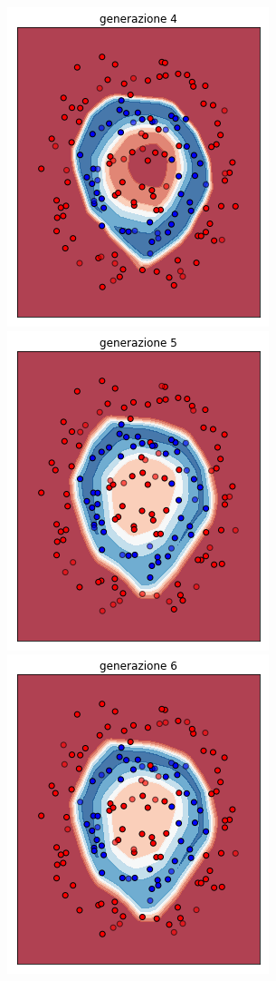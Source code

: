 \documentclass[12pt,a4paper]{report}
\begin{document}
\begin{figure}[H]
 \includegraphics[scale = 0.3]{images/circle+-rnd-acc./4}
 \includegraphics[scale = 0.3]{images/circle+-rnd-acc./5}
 \\
 \includegraphics[scale = 0.3]{images/circle+-rnd-acc./6}

\end{figure}
\end{document}
